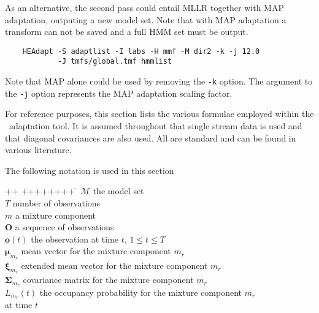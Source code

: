 As an alternative, the second pass could entail MLLR together with
MAP adaptation, outputing a new model set. Note that with MAP adaptation a
transform can not be saved and a full HMM set must be output.  
\begin{verbatim}
    HEAdapt -S adaptlist -I labs -H mmf -M dir2 -k -j 12.0
            -J tmfs/global.tmf hmmlist
\end{verbatim}
Note that MAP alone could be used by removing the \texttt{-k}
option. The argument to the \texttt{-j} option represents the MAP
adaptation scaling factor.



For reference purposes, this section lists the various formulae
employed within the \HTK\ adaptation tool. It is assumed throughout
that single stream data is used and that diagonal covariances are also
used. All are standard and can be found in various literature.
 
The following notation is used in this section
\begin{tabbing}
++ \= ++++++++ \= \kill
\> $\mathcal{M}$ \> the model set\\
\> $T$ \> number of observations \\
\> $m$ \> a mixture component \\
\> $\bm{O}$      \> a sequence of observations \\
\> $\bm{o}(t)$    \> the observation at time $t$, $1 \leq t \leq T $
\\
\> $\bm{\mu}_{m_r}$  \> mean vector for the mixture component $m_r$\\
\> $\bm{\xi}_{m_r}$  \> extended mean vector for the mixture component $m_r$\\
\> $\bm{\Sigma}_{m_r}$  \> covariance matrix for the mixture component $m_r$ \\
\> $L_{m_r}(t)$ \> the occupancy probability for the mixture component $m_r$\\
\>              \>   at time $t$        
\end{tabbing}

\newcommand{\like}{L_{m_r}(t)}


